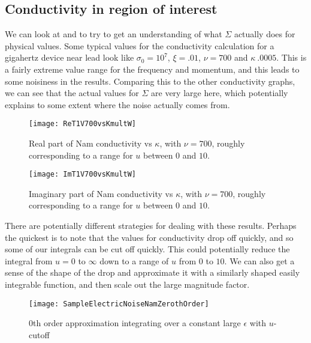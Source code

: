 \documentclass[11pt]{article}
\begin{document}
	\subsection{Conductivity in region of interest} \label{subsec:sample:namresult}
	We can look at  and  to try to get an understanding of what $\Sigma$ actually does for physical values.
	Some typical values for the conductivity calculation for a gigahertz device near lead look like $\sigma_0 = 10^7$, $\xi = .01$, $\nu = 700$ and $\kappa ~ .0005$.
	This is a fairly extreme value range for the frequency and momentum, and this leads to some noisiness in the results.
	Comparing this to the other conductivity graphs, we can see that the actual values for $\Sigma$ are very large here, which potentially explains to some extent where the noise actually comes from.

	\begin{figure}[htp]
		\centering
		\texttt{[image: ReT1V700vsKmultW]}
		\caption{Real part of Nam conductivity vs $\kappa$, with $\nu = 700$, roughly corresponding to a range for $u$ between $0$ and $10$.} \label{fig:ConductivityRe}
	\end{figure}

	\begin{figure}[htp]
		\centering
		\texttt{[image: ImT1V700vsKmultW]}
		\caption{Imaginary part of Nam conductivity vs $\kappa$, with $\nu = 700$, roughly corresponding to a range for $u$ between $0$ and $10$.} \label{fig:ConductivityIm}
	\end{figure}

	There are potentially different strategies for dealing with these results.
	Perhaps the quickest is to note that the values for conductivity drop off quickly, and so some of our integrals can be cut off quickly.
	This could potentially reduce the integral from $u = 0$ to $\infty$ down to a range of $u$ from $0$ to $10$.
	We can also get a sense of the shape of the drop and approximate it with a similarly shaped easily integrable function, and then scale out the large magnitude factor.

	\begin{figure}[htp]
		\centering
		\texttt{[image: SampleElectricNoiseNamZerothOrder]}
		\caption{0th order approximation integrating over a constant large $\epsilon$ with $u$-cutoff} \label{fig:NamZerothOrder}
	\end{figure}
\end{document}
